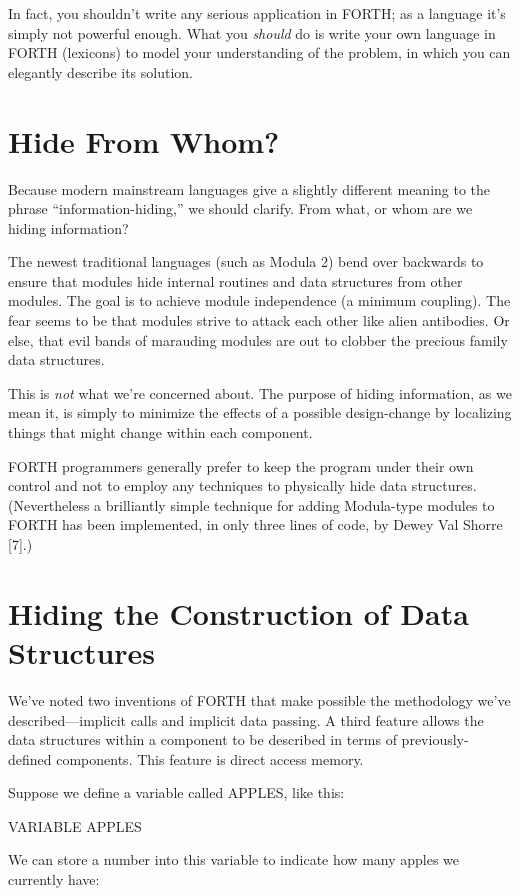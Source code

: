 In fact, you shouldn't write any serious application in FORTH; as
a language it's simply not powerful enough. What you \emph{should}
do is write your own language in FORTH (lexicons) to model your understanding
of the problem, in which you can elegantly describe its solution.


\section{Hide From Whom?}
Because modern mainstream languages give a slightly different meaning
to the phrase {}``information-hiding,'' we should clarify. From
what, or whom are we hiding information?

The newest traditional languages (such as Modula 2) bend over backwards
to ensure that modules hide internal routines and data structures
from other modules. The goal is to achieve module independence (a
minimum coupling). The fear seems to be that modules strive to attack
each other like alien antibodies. Or else, that evil bands of marauding
modules are out to clobber the precious family data structures.

This is \emph{not} what we're concerned about. The purpose of hiding
information, as we mean it, is simply to minimize the effects of a
possible design-change by localizing things that might change within
each component.

FORTH programmers generally prefer to keep the program under their
own control and not to employ any techniques to physically hide data
structures. (Nevertheless a brilliantly simple technique for adding
Modula-type modules to FORTH has been implemented, in only three lines
of code, by Dewey Val Shorre {[}7{]}.)


\section{Hiding the Construction of Data Structures}
We've noted two inventions of FORTH that make possible the methodology
we've described---implicit calls and implicit data passing. A third
feature allows the data structures within a component to be described
in terms of previously-defined components. This feature is direct
access memory.

Suppose we define a variable called APPLES, like this:

\begin{Code}
VARIABLE APPLES
\end{Code}
We can store a number into this variable to indicate how many apples
we currently have:

